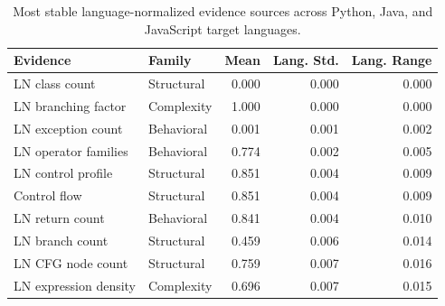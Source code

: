 \begin{table}[!htbp]
\centering
\scriptsize
\begin{tabular}{llrrr}
\toprule
Evidence & Family & Mean & Lang. Std. & Lang. Range \\
\midrule
LN class count & Structural & 0.000 & 0.000 & 0.000 \\
LN branching factor & Complexity & 1.000 & 0.000 & 0.000 \\
LN exception count & Behavioral & 0.001 & 0.001 & 0.002 \\
LN operator families & Behavioral & 0.774 & 0.002 & 0.005 \\
LN control profile & Structural & 0.851 & 0.004 & 0.009 \\
Control flow & Structural & 0.851 & 0.004 & 0.009 \\
LN return count & Behavioral & 0.841 & 0.004 & 0.010 \\
LN branch count & Structural & 0.459 & 0.006 & 0.014 \\
LN CFG node count & Structural & 0.759 & 0.007 & 0.016 \\
LN expression density & Complexity & 0.696 & 0.007 & 0.015 \\
\bottomrule
\end{tabular}
\vspace{0.5em}
\caption{Most stable language-normalized evidence sources across Python, Java, and JavaScript target languages.}
\label{tab:language-normalized-stability}
\end{table}
